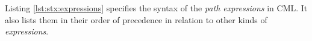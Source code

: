 Listing \ref{lst:stx:expressions} specifies the syntax of
the \emph{path expressions} in CML.
It also lists them in their order of precedence
in relation to other kinds of \emph{expressions}.
